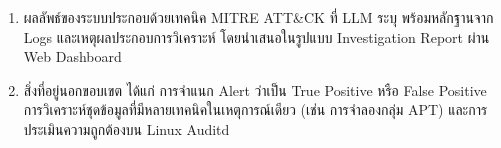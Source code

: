 \begin{enumerate}
    \item ผลลัพธ์ของระบบประกอบด้วยเทคนิค MITRE ATT\&CK ที่ LLM ระบุ
          พร้อมหลักฐานจาก Logs และเหตุผลประกอบการวิเคราะห์
          โดยนำเสนอในรูปแบบ Investigation Report ผ่าน Web Dashboard

    \item สิ่งที่อยู่นอกขอบเขต ได้แก่ การจำแนก Alert ว่าเป็น True Positive หรือ False Positive
          การวิเคราะห์ชุดข้อมูลที่มีหลายเทคนิคในเหตุการณ์เดียว (เช่น การจำลองกลุ่ม APT)
          และการประเมินความถูกต้องบน Linux Auditd
\end{enumerate}


